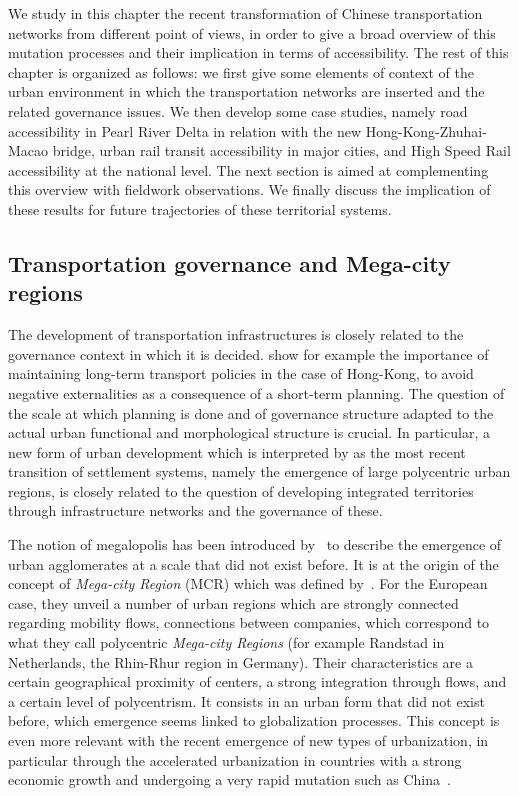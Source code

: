 We study in this chapter the recent transformation of Chinese transportation networks from different point of views, in order to give a broad overview of this mutation processes and their implication in terms of accessibility. The rest of this chapter is organized as follows: we first give some elements of context of the urban environment in which the transportation networks are inserted and the related governance issues. We then develop some case studies, namely road accessibility in Pearl River Delta in relation with the new Hong-Kong-Zhuhai-Macao bridge, urban rail transit accessibility in major cities, and High Speed Rail accessibility at the national level. The next section is aimed at complementing this overview with fieldwork observations. We finally discuss the implication of these results for future trajectories of these territorial systems.





\subsection{Transportation governance and Mega-city regions}


The development of transportation infrastructures is closely related to the governance context in which it is decided. \cite{tang2008impact} show for example the importance of maintaining long-term transport policies in the case of Hong-Kong, to avoid negative externalities as a consequence of a short-term planning. The question of the scale at which planning is done and of governance structure adapted to the actual urban functional and morphological structure is crucial. In particular, a new form of urban development which is interpreted by \cite{lenechet2017peupler} as the most recent transition of settlement systems, namely the emergence of large polycentric urban regions, is closely related to the question of developing integrated territories through infrastructure networks and the governance of these.


The notion of megalopolis has been introduced by~\cite{gottmann1961megalopolis} to describe the emergence of urban agglomerates at a scale that did not exist before. It is at the origin of the concept of \emph{Mega-city Region} (MCR) which was defined by~\cite{hall2006polycentric}. For the European case, they unveil a number of urban regions which are strongly connected regarding mobility flows, connections between companies, which correspond to what they call polycentric \emph{Mega-city Regions} (for example Randstad in Netherlands, the Rhin-Rhur region in Germany). Their characteristics are a certain geographical proximity of centers, a strong integration through flows, and a certain level of polycentrism. It consists in an urban form that did not exist before, which emergence seems linked to globalization processes. This concept is even more relevant with the recent emergence of new types of urbanization, in particular through the accelerated urbanization in countries with a strong economic growth and undergoing a very rapid mutation such as China~\citep{swerts2015megacities}.


